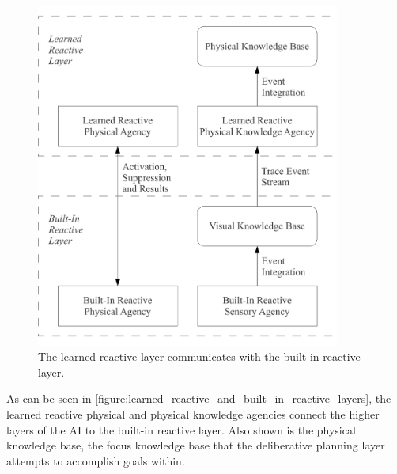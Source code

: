 \begin{figure}
\centering
\includegraphics[width=10cm]{gfx/learned_reactive_and_built_in_reactive_layers}
\caption{The learned reactive layer communicates with the built-in
  reactive layer.}
\label{figure:learned_reactive_and_built_in_reactive_layers}
\end{figure}
As can be seen in
{\mbox{\autoref{figure:learned_reactive_and_built_in_reactive_layers}}},
the learned reactive physical and physical knowledge agencies connect
the higher layers of the AI to the built-in reactive layer.  Also
shown is the physical knowledge base, the focus knowledge base that
the deliberative planning layer attempts to accomplish goals within.

